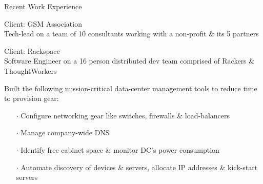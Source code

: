 \documentclass{resume} %
\begin{document}
\begin{rSection}{Recent Work Experience}
\begin{rSubsection}{}{}{}{}{Client: GSM Association\\Tech-lead on a team of 10 consultants working with a non-profit
  \& its 5 partners}
\end{rSubsection}\vspace{-1em}



\begin{rSubsection}{}{}{}{}
{Client: Rackspace\\Software Engineer on a 16 person distributed dev team comprised of Rackers \& ThoughtWorkers}

\item Built the following mission-critical data-center management tools to reduce time to provision gear:
\vspace{-0.5em}
\begin{itemize}  \itemsep0.5pt \parskip0pt
    \item[$\cdot$] Configure networking gear like switches, firewalls \& load-balancers
    \item[$\cdot$] Manage company-wide DNS
    \item[$\cdot$] Identify free cabinet space \& monitor DC's power consumption
    \item[$\cdot$] Automate discovery of devices \& servers, allocate IP addresses \& kick-start servers
\end{itemize}

\end{rSubsection}








\end{rSection}
\end{document}
